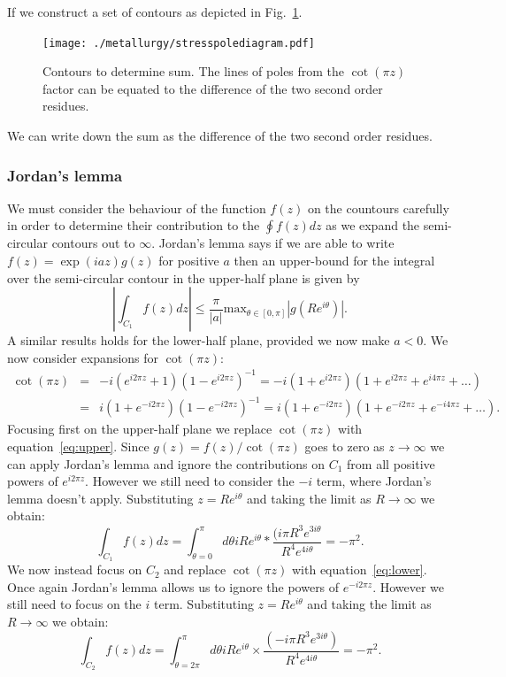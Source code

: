 If we construct a set of contours as depicted in Fig.~\ref{fig:polediagram}.
\begin{figure}[!tbp]
\begin{center}
\texttt{[image: ./metallurgy/stresspolediagram.pdf]}
\caption{Contours to determine sum. The lines of poles from the $\cot(\pi z)$ 
factor can be equated to the difference of the two 
second order residues.\label{fig:polediagram}}
\end{center}
\end{figure}

We can write down the sum as the difference of the two second order residues.

\subsubsection{Jordan's lemma}
We must consider the behaviour of the function $f(z)$ on the countours carefully in order to determine their contribution to the $\oint f(z) dz$ as we expand the semi-circular contours out to $\infty$.  Jordan's lemma says if we are able to write $f(z) = \exp(iaz)g(z)$ for positive $a$ then an upper-bound for the integral over the semi-circular contour in the upper-half plane is given by
%
\begin{equation}
\left|\int_{C_{1}}f(z)dz\right| \leq \frac{\pi}{|a|}\text{max}_{\theta\in [0,\pi]}\left|g(Re^{i\theta})\right|.
\end{equation}
%
A similar results holds for the lower-half plane, provided we now make $a<0$.  We now consider expansions for $\cot(\pi z)$:
%
\begin{eqnarray}
\cot(\pi z)&=&-i(e^{i2\pi z}+1)(1-e^{i2\pi z})^{-1}=-i(1+e^{i2\pi z})(1+e^{i2\pi z}+e^{i4\pi z}+\ldots)\label{eq:upper}\\
&=&i(1+e^{-i2\pi z})(1-e^{-i2\pi z})^{-1}=i(1+e^{-i2\pi z})(1+e^{-i2\pi z}+e^{-i4\pi z}+\ldots)\label{eq:lower}.
\end{eqnarray}
%
Focusing first on the upper-half plane we replace $\cot(\pi z)$ with equation~\ref{eq:upper}.  
Since $g(z)=f(z)/\cot(\pi z)$ goes to zero as $z\rightarrow\infty$ we can apply Jordan's 
lemma and ignore the contributions on $C_{1}$ from all positive powers of $e^{i2\pi z}$.  
However we still need to consider the $-i$ term, where Jordan's lemma doesn't apply.  
Substituting $z=Re^{i\theta}$ and taking the limit as $R\rightarrow\infty$ we obtain:
\begin{equation}
\int_{C_{1}}f(z)dz = \int_{\theta=0}^{\pi}d\theta iRe^{i\theta}*\frac{(i\pi R^{3}e^{3i\theta}}{R^{4}e^{4i\theta}} = -\pi^{2}.
\end{equation}
We now instead focus on $C_{2}$ and replace $\cot(\pi z)$ with equation~\ref{eq:lower}.  
Once again Jordan's lemma allows us to ignore the powers of $e^{-i2\pi z}$.  
However we still need to focus on the $i$ term.  Substituting $z=Re^{i\theta}$ and 
taking the limit as $R\rightarrow\infty$ we obtain:
%
\begin{equation}
\int_{C_{2}}f(z)dz = \int_{\theta=2\pi}^{\pi}d\theta iRe^{i\theta}\times\frac{(-i\pi R^{3}e^{3i\theta})}{R^{4}e^{4i\theta}} = -\pi^{2}.
\end{equation}

